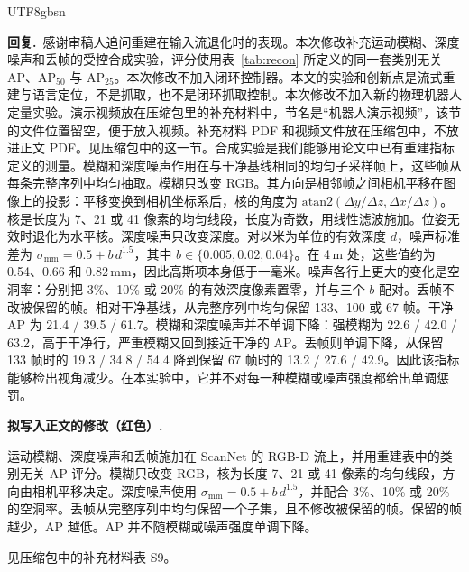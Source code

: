 \documentclass[11pt]{article}
\newcommand{\revresponse}[1]{%
  \par\noindent\textbf{回复.}\ #1\par\vspace{0.3em}}
\newcommand{\revchange}[1]{%
  \par\noindent\textbf{拟写入正文的修改（红色）.}\par
  \noindent\textcolor{revred}{#1}\par\vspace{0.8em}}
\begin{document}
\begin{CJK*}{UTF8}{gbsn}
\revresponse{感谢审稿人追问重建在输入流退化时的表现。本次修改补充运动模糊、深度噪声和丢帧的受控合成实验，评分使用表~\ref{tab:recon} 所定义的同一套类别无关 AP、AP\(_{50}\) 与 AP\(_{25}\)。本次修改不加入闭环控制器。本文的实验和创新点是流式重建与语言定位，不是抓取，也不是闭环抓取控制。本次修改不加入新的物理机器人定量实验。演示视频放在压缩包里的补充材料中，节名是“机器人演示视频”，该节的文件位置留空，便于放入视频。补充材料 PDF 和视频文件放在压缩包中，不放进正文 PDF。见压缩包中的这一节。合成实验是我们能够用论文中已有重建指标定义的测量。模糊和深度噪声作用在与干净基线相同的均匀子采样帧上，这些帧从每条完整序列中均匀抽取。模糊只改变 RGB。其方向是相邻帧之间相机平移在图像上的投影：平移变换到相机坐标系后，核的角度为 \(\mathrm{atan2}(\Delta y/\Delta z,\Delta x/\Delta z)\)。核是长度为 7、21 或 41 像素的均匀线段，长度为奇数，用线性滤波施加。位姿无效时退化为水平核。深度噪声只改变深度。对以米为单位的有效深度 \(d\)，噪声标准差为 \(\sigma_{\mathrm{mm}}=0.5+b\,d^{1.5}\)，其中 \(b\in\{0.005,0.02,0.04\}\)。在 4\,m 处，这些值约为 0.54、0.66 和 0.82\,mm，因此高斯项本身低于一毫米。噪声各行上更大的变化是空洞率：分别把 3\%、10\% 或 20\% 的有效深度像素置零，并与三个 \(b\) 配对。丢帧不改被保留的帧。相对干净基线，从完整序列中均匀保留 133、100 或 67 帧。干净 AP 为 21.4 / 39.5 / 61.7。模糊和深度噪声并不单调下降：强模糊为 22.6 / 42.0 / 63.2，高于干净行，严重模糊又回到接近干净的 AP。丢帧则单调下降，从保留 133 帧时的 19.3 / 34.8 / 54.4 降到保留 67 帧时的 13.2 / 27.6 / 42.9。因此该指标能够检出视角减少。在本实验中，它并不对每一种模糊或噪声强度都给出单调惩罚。}

\revchange{运动模糊、深度噪声和丢帧施加在 ScanNet 的 RGB-D 流上，并用重建表中的类别无关 AP 评分。模糊只改变 RGB，核为长度 7、21 或 41 像素的均匀线段，方向由相机平移决定。深度噪声使用 \(\sigma_{\mathrm{mm}}=0.5+b\,d^{1.5}\)，并配合 3\%、10\% 或 20\% 的空洞率。丢帧从完整序列中均匀保留一个子集，且不修改被保留的帧。保留的帧越少，AP 越低。AP 并不随模糊或噪声强度单调下降。}

\noindent 见压缩包中的补充材料表 S9。


\end{CJK*}
\end{document}
